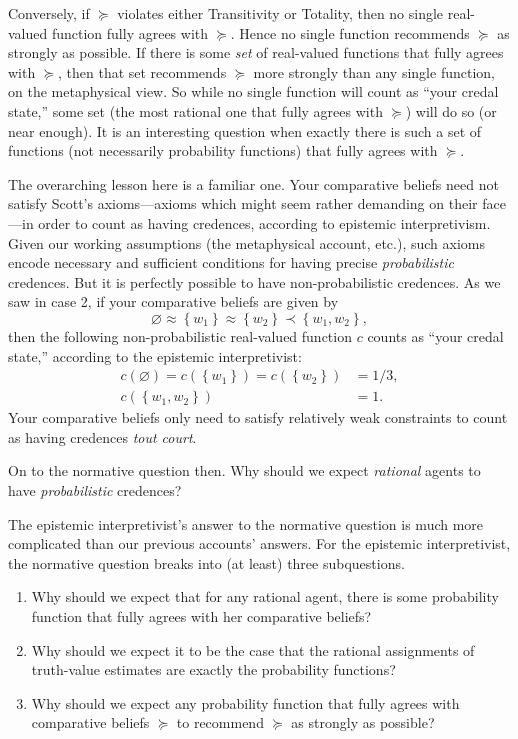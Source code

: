 Conversely, if $\succeq$ violates either Transitivity or Totality, then no single real-valued function fully agrees with $\succeq$. Hence no single function recommends $\succeq$ as strongly as possible. If there is some \textit{set} of real-valued functions that fully agrees with $\succeq$, then that set recommends $\succeq$ more strongly than any single function, on the metaphysical view. So while no single function will count as ``your credal state,'' some set (the most rational one that fully agrees with $\succeq$) will do so (or near enough). It is an interesting question when exactly there is such a set of functions (not necessarily probability functions) that fully agrees with $\succeq$.

The overarching lesson here is a familiar one. Your comparative beliefs need not satisfy Scott's axioms---axioms which might seem rather demanding on their face---in order to count as having credences, according to epistemic interpretivism. Given our working assumptions (the metaphysical account, etc.), such axioms encode necessary and sufficient conditions for having precise \textit{probabilistic} credences. But it is perfectly possible to have non-probabilistic credences. As we saw in case 2, if your comparative beliefs are given by
$$ \varnothing\approx\left\{w_1\right\}\approx\left\{w_2\right\}\prec\left\{w_1,w_2\right\}, $$
then the following non-probabilistic real-valued function $c$ counts as ``your credal state,'' according to the epistemic interpretivist:
$$
\begin{aligned}
	c(\varnothing)=c(\left\{w_1\right\})=c(\left\{w_2\right\}) &= 1/3,\\
	c(\left\{w_1,w_2\right\}) &= 1.
\end{aligned}
$$
Your comparative beliefs only need to satisfy relatively weak constraints to count as having credences \textit{tout court}.

On to the normative question then. Why should we expect \textit{rational} agents to have \textit{probabilistic} credences? 

The epistemic interpretivist's answer to the normative question is much more complicated than our previous accounts' answers. For the epistemic interpretivist, the normative question breaks into (at least) three subquestions.
\begin{enumerate}
\item Why should we expect that for any rational agent, there is some probability function that fully agrees with her comparative beliefs?

\item Why should we expect it to be the case that the rational assignments of truth-value estimates are exactly the probability functions?

\item Why should we expect any probability function that fully agrees with comparative beliefs $\succeq$ to recommend $\succeq$ as strongly as possible?
\end{enumerate}

